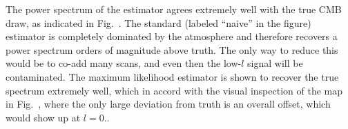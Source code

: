 
The power spectrum of the estimator agrees extremely well with the true CMB draw, as indicated in Fig.~. The standard (labeled ``naive'' in the figure) estimator is completely dominated by the atmosphere and therefore recovers a power spectrum orders of magnitude above truth. The only way to reduce this would be to co-add many scans, and even then the low-$l$ signal will be contaminated. The maximum likelihood estimator is shown to recover the true spectrum extremely well, which in accord with the visual inspection of the map in Fig.~, where the only large deviation from truth is an overall offset, which would show up at $l=0$..






